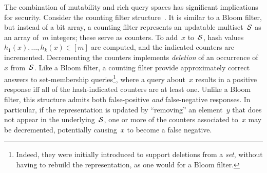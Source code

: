 The combination of mutability and rich query spaces has significant implications
for security. Consider the counting filter
structure~\cite{fan2000summary}.  It is similar to a Bloom filter, but 
instead of a bit array, a counting filter represents an updatable
multiset~$\mathcal{S}$ as an array of~$m$ integers; these serve as counters.
To add~$x$ to~$\mathcal{S}$, hash values $h_1(x), \ldots,
h_k(x)\in[m]$ are computed, and the indicated counters are
incremented.  Decrementing the counters implements \emph{deletion} of
an occurrence of~$x$ from~$\mathcal{S}$. %
%
Like a Bloom filter, a counting filter provide approximately correct
answers to set-membership queries\footnote{Indeed, they were initially
introduced to support deletions from a \emph{set}, without having to
rebuild the representation, as one would for a Bloom filter.}, where a
query about~$x$ results in a positive response iff all of the
hash-indicated counters are at least one.%
%
%
%
Unlike a Bloom filter, this structure admits both false-positive \emph{and} false-negative responses.
In particular, if the representation is updated by ``removing'' an element~$y$
that does not appear in the underlying~$\mathcal{S}$, one or more of the counters
associated to~$x$ may be decremented, potentially causing~$x$ to become a false
negative.


